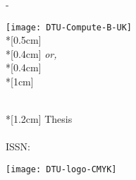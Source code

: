 \thispagestyle{empty}             %
\calccentering{\unitlength}
\begin{adjustwidth*}{\unitlength}{-\unitlength}
    \begin{adjustwidth}{-0.5cm}{-0.5cm}
        \texttt{[image: DTU-Compute-B-UK]}\\*[0.5cm]
%            
        \vfill
{        
        \centering
        \Huge \thesistitle{}\\*[0.4cm]
        \LARGE \emph{or,}\\*[0.4cm]
        \thesissubtitle{}\\*[1cm]
}
        \vspace{2cm}
        \parbox[b]{0.5\linewidth}{%
            \large 
            \thesisauthor{}\\*[1.2cm]
            {
            \small
            \thesistypeabbr{} Thesis\\[0cm]
            \thesisnumber{}\\[0cm]
            ISSN: \thesisISSN{}
            }
        }
        \hfill\texttt{[image: DTU-logo-CMYK]}
    \end{adjustwidth}
\end{adjustwidth*}
\normalfont
\normalsize
